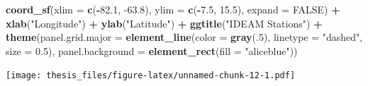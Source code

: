 \documentclass[12pt,oneside]{reedthesis}
\newenvironment{Shaded}{\begin{snugshade}}{\end{snugshade}}
\newcommand{\DataTypeTok}[1]{\textcolor[rgb]{0.13,0.29,0.53}{#1}}
\newcommand{\DecValTok}[1]{\textcolor[rgb]{0.00,0.00,0.81}{#1}}
\newcommand{\FloatTok}[1]{\textcolor[rgb]{0.00,0.00,0.81}{#1}}
\newcommand{\KeywordTok}[1]{\textcolor[rgb]{0.13,0.29,0.53}{\textbf{#1}}}
\newcommand{\NormalTok}[1]{#1}
\newcommand{\OperatorTok}[1]{\textcolor[rgb]{0.81,0.36,0.00}{\textbf{#1}}}
\newcommand{\OtherTok}[1]{\textcolor[rgb]{0.56,0.35,0.01}{#1}}
\newcommand{\StringTok}[1]{\textcolor[rgb]{0.31,0.60,0.02}{#1}}
\begin{document}
\begin{Shaded}
\begin{Highlighting}[]
\StringTok{  }\KeywordTok{coord_sf}\NormalTok{(}\DataTypeTok{xlim =} \KeywordTok{c}\NormalTok{(}\OperatorTok{-}\FloatTok{82.1}\NormalTok{, }\FloatTok{-63.8}\NormalTok{), }\DataTypeTok{ylim =} \KeywordTok{c}\NormalTok{(}\OperatorTok{-}\FloatTok{7.5}\NormalTok{, }\FloatTok{15.5}\NormalTok{), }\DataTypeTok{expand =} \OtherTok{FALSE}\NormalTok{) }\OperatorTok{+}
\StringTok{  }\KeywordTok{xlab}\NormalTok{(}\StringTok{"Longitude"}\NormalTok{) }\OperatorTok{+}\StringTok{ }
\StringTok{  }\KeywordTok{ylab}\NormalTok{(}\StringTok{"Latitude"}\NormalTok{) }\OperatorTok{+}\StringTok{ }
\StringTok{  }\KeywordTok{ggtitle}\NormalTok{(}\StringTok{"IDEAM Stations"}\NormalTok{) }\OperatorTok{+}\StringTok{ }
\StringTok{  }\KeywordTok{theme}\NormalTok{(}\DataTypeTok{panel.grid.major =} \KeywordTok{element_line}\NormalTok{(}\DataTypeTok{color =} \KeywordTok{gray}\NormalTok{(.}\DecValTok{5}\NormalTok{), }\DataTypeTok{linetype =} \StringTok{"dashed"}\NormalTok{, }\DataTypeTok{size =} \FloatTok{0.5}\NormalTok{), }\DataTypeTok{panel.background =} \KeywordTok{element_rect}\NormalTok{(}\DataTypeTok{fill =} \StringTok{"aliceblue"}\NormalTok{))}
\end{Highlighting}
\end{Shaded}
\texttt{[image: thesis\_files/figure-latex/unnamed-chunk-12-1.pdf]}
\end{document}
